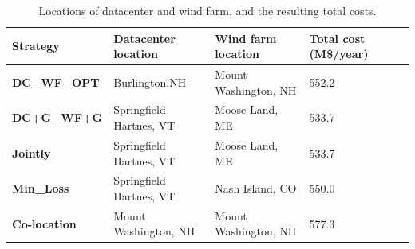 \begin{table}[ht]
\begin{center}
\caption{Locations of datacenter and wind farm, and the resulting
  total costs.}
\begin{tabular}{|l|p{50pt}|p{50pt}|p{30pt}|p{20pt}|}
\hline
\textbf{Strategy}& \textbf{Datacenter location} &\textbf{Wind farm location} &\textbf{Total cost (M\$/year)}%
 \\
\hline
\textbf{DC\_WF\_OPT} &  Burlington,NH  & Mount Washington, NH & 552.2%
\\
\textbf{DC+G\_WF+G} &Springfield Hartnes, VT  & Moose Land, ME& 533.7%
\\
\textbf{Jointly} &Springfield Hartnes, VT&  Moose Land, ME & 533.7%
\\
\textbf{Min\_Loss} &Springfield Hartnes, VT & Nash Island, CO & 550.0%
\\
\textbf{Co-location}& Mount Washington, NH &Mount Washington, NH& 577.3%
\\
\hline
\end{tabular}
\label{tab:costsaving}
\end{center}
\vspace{-0.2in}
\end{table}

